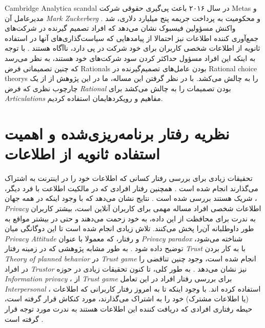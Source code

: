 \gls{Cambridge Analytica scandal}
در سال ۲۰۱۶ باعث پی‌گیری‌ حقوقی شرکت
\glspl{Meta}
و مدیرعامل آن
\textit{
  \gls{Mark Zuckerberg}
}
و محکومیت به پرداخت جریمه پنج میلیارد دلاری، شد
.
واکنش مسؤولین فیسبوک نشان می‌دهد
که افراد تصمیم گیرنده در شرکت‌های جمع‌آوری کننده
اطلاعات نیز احتمالا از پیامدهایی که سیاست‌گذاری‌های آنها در استفاده ثانویه از اطلاعات شخصی کاربران
برای خود شرکت در پی دارد، ناآگاه هستند
\!. با توجه به اینکه این افراد مسؤول حداکثر
کردن سود شرکت‌های خود هستند،
به نظر می‌رسد که چنین تصمیماتی فرض
\glspl{Rational}
بودن عامل‌های تصمیم‌گیرنده در
\glspl{Rational choice theory}
را به چالش می‌کشد. با در نظر گرفتن این مساله‌، ما در این پژوهش از از یک چارچوب نظری که فرض
\textit{
  \gls{Rational}
}
بودن تصمیمات را به چالش می‌کشد برای
\textit{
  \glspl{Articulation}
}
مفاهیم و رویکردهایمان استفاده کردیم.

\section{نظریه رفتار برنامه‌ریزی‌شده و اهمیت استفاده ثانویه از اطلاعات}
تحقیقات زیادی برای بررسی رفتار کسانی که
اطلاعات خود را در اینترنت به اشتراک می‌گذارند انجام شده است
\!.
همچنین رفتار افرادی که در مالکیت اطلاعت با فرد دیگر، شریک هستند بررسی شده است
\!.
نتایج نشان می‌دهد که با وجود اینکه در همه جهان
\!،
\textit{
  \gls{Privacy}
}
اطلاعات شخصی افراد مساله مهمی برای کاربران آنلاین
است، بیشتر کاربران به ندرت برای محافظت از این داده، به خود زحمت می‌دهند و حتی در
بیشتر مواقع به طور داوطلبانه آن‌را پخش می‌کنند. تلاش زیادی انجام شده است تا این
دوگانگی میان
\textit{
  \gls{Privacy Attitude}
}
و رفتار، که معمولا با عنوان
\textit{
  \gls{Privacy paradox}
}
شناخته می‌شود، توضیح داده شود
.
به طور مشابه پژوهشی که در زمینه رفتار
\textit{
  \gls{Trust}
}
با به کار بردن
\textit{
  \gls{Theory of planned behavior}
}
در
\textit{
  \gls{Trust game}
}
انجام شده است،  وجود چنین تناقضی را در افراد
\textit{
  \gls{Trustor}
}
نیز نشان می‌دهد
\!\citep{gazdagNotWantTrust2019}.
به طور کلی، تا کنون  تحقیقات زیادی در حوزه
\textit{
  \gls{Information privacy}
}،
از
\textit{
  \gls{Trust game}
}
برای بررسی رفتار افراد در این تعامل
\textit{
  \gls{Interpersonal}
}،
استفاده کرده اند. با وجود اینکه تا به امروز رفتار کاربرانی که اطلاعات
\!(یا اطلاعات مشترک)
خود را به اشتراک می‌گذارند، مورد کنکاش قرار گرفته است، حیطه
رفتاری افرادی که دریافت کننده این  اطلاعات هستند به ندرت
مورد توجه قرار گرفته است
\!\citep{demmersYourDataAre2021}. 

